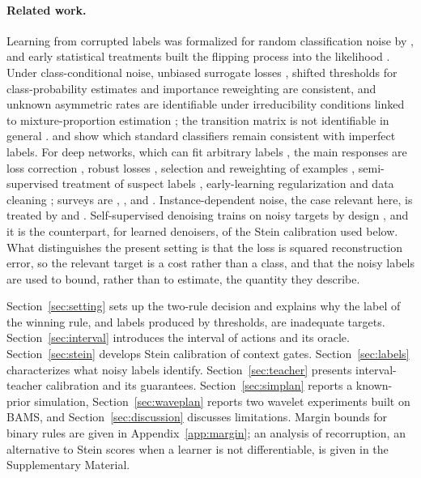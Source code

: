 \documentclass[11pt]{article}
\theoremstyle{plain}
\theoremstyle{definition}
\theoremstyle{remark}
\begin{document}
\paragraph{Related work.} Learning from corrupted labels was formalized for random
classification noise by \citet{angluin1988learning}, and early statistical treatments built
the flipping process into the likelihood \citep{lawrence2001estimating,bootkrajang2012label}.
Under class-conditional noise, unbiased surrogate losses \citep{natarajan2013learning},
shifted thresholds for class-probability estimates \citep{menon2015learning} and importance
reweighting \citep{liu2016classification} are consistent, and unknown asymmetric rates are
identifiable under irreducibility conditions linked to mixture-proportion estimation
\citep{scott2013classification,blanchard2016classification,ramaswamy2016mixture}; the
transition matrix is not identifiable in general \citep{liu2023identifiability}.
\citet{cannings2020classification} and \citet{reeve2019fast} show which standard classifiers
remain consistent with imperfect labels. For deep networks, which can fit arbitrary labels
\citep{zhang2017understanding,arpit2017closer}, the main responses are loss correction
\citep{patrini2017making,hendrycks2018using}, robust losses \citep{ghosh2017robust,
zhang2018generalized,wang2019symmetric}, selection and reweighting of examples
\citep{han2018coteaching,jiang2018mentornet,ren2018learning,shu2019meta}, semi-supervised
treatment of suspect labels \citep{li2020dividemix}, early-learning regularization
\citep{liu2020early} and data cleaning \citep{northcutt2021confident}; surveys are
\citet{frenay2014classification}, \citet{han2020survey}, \citet{algan2021image} and
\citet{song2023learning}. Instance-dependent noise, the case relevant here, is treated by
\citet{xia2020part} and \citet{cheng2021learning}. Self-supervised denoising trains on noisy
targets by design \citep{lehtinen2018noise2noise,batson2019noise2self,krull2019noise2void,
moran2020noisier2noise,pang2021recorrupted}, and it is the counterpart, for learned
denoisers, of the Stein calibration used below. What distinguishes the present setting is
that the loss is squared reconstruction error, so the relevant target is a cost rather than
a class, and that the noisy labels are used to bound, rather than to estimate, the quantity
they describe.

Section~\ref{sec:setting} sets up the two-rule decision and explains why the label of the
winning rule, and labels produced by thresholds, are inadequate targets.
Section~\ref{sec:interval} introduces the interval of actions and its oracle.
Section~\ref{sec:stein} develops Stein calibration of context gates.
Section~\ref{sec:labels} characterizes what noisy labels identify.
Section~\ref{sec:teacher} presents interval-teacher calibration and its guarantees.
Section~\ref{sec:simplan} reports a known-prior simulation, Section~\ref{sec:waveplan}
reports two wavelet experiments built on BAMS, and
Section~\ref{sec:discussion} discusses limitations. Margin bounds for binary rules are given
in Appendix~\ref{app:margin}; an analysis of recorruption, an alternative to Stein scores when
a learner is not differentiable, is given in the Supplementary Material.
\end{document}
